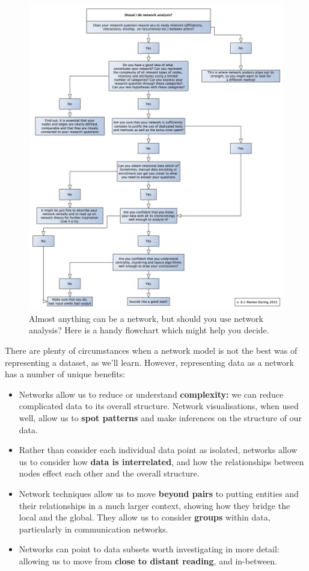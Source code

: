 \documentclass[
]{book}
\begin{document}
\begin{figure}
\centering
\includegraphics[width=7.29167in,height=\textheight]{images/shouldyoudonetworkanalysis_xxl.jpg}
\caption{Almost anything can be a network, but should you use network analysis? Here is a handy flowchart which might help you decide.}
\end{figure}

There are plenty of circumstances when a network model is not the best was of representing a dataset, as we'll learn. However, representing data as a network has a number of unique benefits:

\begin{itemize}
\item
  Networks allow us to reduce or understand \textbf{complexity:} we can reduce complicated data to its overall structure. Network visualisations, when used well, allow us to \textbf{spot patterns} and make inferences on the structure of our data.
\item
  Rather than consider each individual data point as isolated, networks allow us to consider how \textbf{data is interrelated}, and how the relationships between nodes effect each other and the overall structure.
\item
  Network techniques allow us to move \textbf{beyond pairs} to putting entities and their relationships in a much larger context, showing how they bridge the local and the global. They allow us to consider \textbf{groups} within data, particularly in communication networks.
\item
  Networks can point to data subsets worth investigating in more detail: allowing us to move from \textbf{close to distant reading}, and in-between.
\end{itemize}
\end{document}
